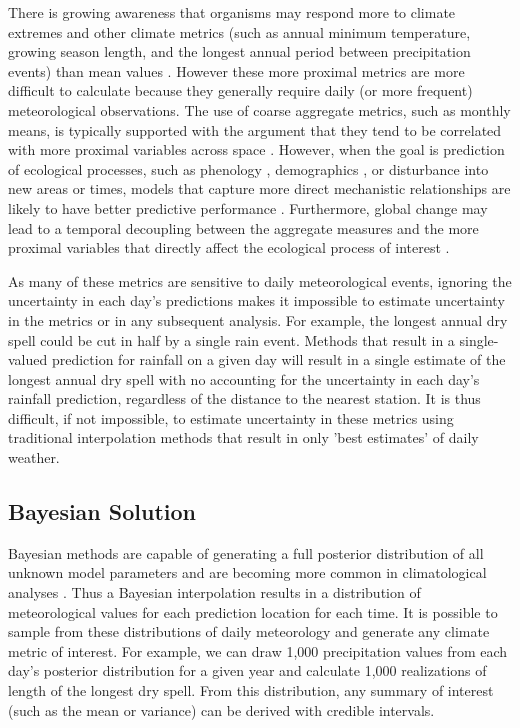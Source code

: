 \documentclass[12pt]{article}
\begin{document}
There is growing awareness that organisms may respond more to
climate extremes and other climate metrics (such as annual minimum temperature, growing season length, and the longest
annual period between precipitation events) than mean values
\citep{gutschick_extreme_2003,trnka_agroclimatic_2011,jackson_ecology_2009}. However
these more proximal metrics are more difficult to calculate because they
generally require daily (or more frequent) meteorological observations.  
The use of coarse aggregate metrics, such as monthly means, is
typically supported with the argument that they tend to be correlated with more
proximal variables across space \citep{jackson_ecology_2009}.
However, when the goal is prediction of ecological processes, such as phenology
\citep[e.g.][]{richardson_phenology_2006}, demographics
\citep[e.g.][]{colchero_predicting_2009,clark_uncertainty_2003}, or
disturbance \citep[e.g.][]{wilson_hierarchical_2010} into new areas or times, models that capture more direct mechanistic
relationships are likely to have better predictive performance
\citep{jackson_ecology_2009}.
Furthermore, global change may lead to a temporal decoupling
between the aggregate measures and the more proximal variables that
directly affect the ecological process of interest
\citep{jackson_ecology_2009}.  

As many of these metrics are sensitive to daily meteorological events, ignoring the uncertainty in each day's predictions
makes it impossible to estimate uncertainty in the metrics or in any
subsequent analysis. 
For example, the longest annual dry spell could be cut in half by a
single rain event.
Methods that result in a single-valued prediction for rainfall on a
given day will result in a single estimate of the longest annual dry
spell with no accounting for the uncertainty in each day's
rainfall prediction, regardless of the distance to the nearest station.
It is thus difficult, if not impossible, to estimate uncertainty in these metrics using
traditional interpolation methods that result in only 'best estimates' of daily weather.  

\subsection{Bayesian Solution}

Bayesian methods are capable of generating a full posterior distribution of all unknown
model parameters \citep{clark_why_2004} and are becoming more common in climatological
analyses \citep[e.g.][]{fischer_climate_2012,iizumi_statistical_2012,ruggieri_bayesian_2013}.  
Thus a Bayesian interpolation results in a
distribution of meteorological values for each prediction location for
each time.  
It is possible to sample from these distributions of daily meteorology
and generate any climate metric of interest.
For example, we can draw 1,000 precipitation values from each day's
posterior distribution for a given year and calculate 1,000
realizations of length of the longest dry spell.  From this
distribution, any summary of interest (such as the mean or variance) can be derived with credible intervals.
\end{document}
